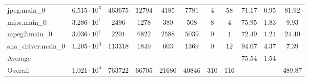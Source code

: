 \begin{tabular}{|l|c|c|c|c|c|c|c|c|c|c|}
jpeg:main\_0            & $ 6.515 \cdot 10^{3} $ & $ 463675 $ & $ 12794 $ & $ 4185  $ & $ 7781  $ & $ 4   $ & $ 58  $ & $ 71.17       $ & $ 0.95    $ & $ 81.92   $ \\
mips:main\_0            & $ 3.286 \cdot 10^{1} $ & $ 2496   $ & $ 1278  $ & $ 380   $ & $ 508   $ & $ 8   $ & $ 4   $ & $ 75.95       $ & $ 1.83    $ & $ 9.93    $ \\
mpeg2:main\_0           & $ 3.036 \cdot 10^{1} $ & $ 2201   $ & $ 6822  $ & $ 2588  $ & $ 5039  $ & $ 0   $ & $ 1   $ & $ 72.49       $ & $ 1.21    $ & $ 24.40   $ \\
sha\_driver:main\_0     & $ 1.205 \cdot 10^{3} $ & $ 113318 $ & $ 1849  $ & $ 603   $ & $ 1369  $ & $ 0   $ & $ 12  $ & $ 94.07       $ & $ 4.37    $ & $ 7.39    $ \\
\hline
Average                 & $                    $ & $        $ & $       $ & $       $ & $       $ & $     $ & $     $ & $ 75.54       $ & $ 1.54    $ & $         $ \\
\hline
Overall                 & $ 1.021 \cdot 10^{4} $ & $ 763722 $ & $ 66705 $ & $ 21680 $ & $ 40846 $ & $ 310 $ & $ 116 $ & $             $ & $         $ & $ 489.87  $ \\
\hline
\end{tabular}
